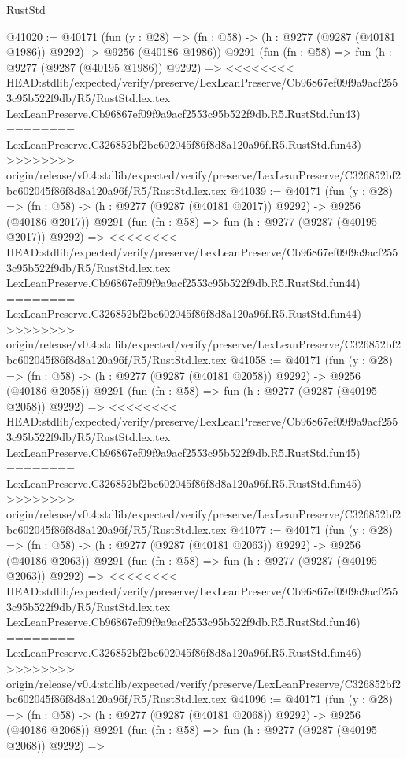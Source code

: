 \begin{lexlean}{RustStd}
\begin{coremodule}
{\begin{coremodule}
{{{{{{{{{{{{{{{{{{{{{{{{{{{{{{{{{{{{{{{{{{{{{{{{{{{{{{{@41020 := @40171
    (fun (y : @28) =>
    (fn : @58) -> (h : @9277 (@9287 (@40181 @1986)) @9292) -> @9256 (@40186 @1986))
    @9291
    (fun (fn : @58) =>
    fun (h : @9277 (@9287 (@40195 @1986)) @9292) =>
<<<<<<<< HEAD:stdlib/expected/verify/preserve/LexLeanPreserve/Cb96867ef09f9a9acf2553c95b522f9db/R5/RustStd.lex.tex
    LexLeanPreserve.Cb96867ef09f9a9acf2553c95b522f9db.R5.RustStd.fun43)
========
    LexLeanPreserve.C326852bf2bc602045f86f8d8a120a96f.R5.RustStd.fun43)
>>>>>>>> origin/release/v0.4:stdlib/expected/verify/preserve/LexLeanPreserve/C326852bf2bc602045f86f8d8a120a96f/R5/RustStd.lex.tex
@41039 := @40171
    (fun (y : @28) =>
    (fn : @58) -> (h : @9277 (@9287 (@40181 @2017)) @9292) -> @9256 (@40186 @2017))
    @9291
    (fun (fn : @58) =>
    fun (h : @9277 (@9287 (@40195 @2017)) @9292) =>
<<<<<<<< HEAD:stdlib/expected/verify/preserve/LexLeanPreserve/Cb96867ef09f9a9acf2553c95b522f9db/R5/RustStd.lex.tex
    LexLeanPreserve.Cb96867ef09f9a9acf2553c95b522f9db.R5.RustStd.fun44)
========
    LexLeanPreserve.C326852bf2bc602045f86f8d8a120a96f.R5.RustStd.fun44)
>>>>>>>> origin/release/v0.4:stdlib/expected/verify/preserve/LexLeanPreserve/C326852bf2bc602045f86f8d8a120a96f/R5/RustStd.lex.tex
@41058 := @40171
    (fun (y : @28) =>
    (fn : @58) -> (h : @9277 (@9287 (@40181 @2058)) @9292) -> @9256 (@40186 @2058))
    @9291
    (fun (fn : @58) =>
    fun (h : @9277 (@9287 (@40195 @2058)) @9292) =>
<<<<<<<< HEAD:stdlib/expected/verify/preserve/LexLeanPreserve/Cb96867ef09f9a9acf2553c95b522f9db/R5/RustStd.lex.tex
    LexLeanPreserve.Cb96867ef09f9a9acf2553c95b522f9db.R5.RustStd.fun45)
========
    LexLeanPreserve.C326852bf2bc602045f86f8d8a120a96f.R5.RustStd.fun45)
>>>>>>>> origin/release/v0.4:stdlib/expected/verify/preserve/LexLeanPreserve/C326852bf2bc602045f86f8d8a120a96f/R5/RustStd.lex.tex
@41077 := @40171
    (fun (y : @28) =>
    (fn : @58) -> (h : @9277 (@9287 (@40181 @2063)) @9292) -> @9256 (@40186 @2063))
    @9291
    (fun (fn : @58) =>
    fun (h : @9277 (@9287 (@40195 @2063)) @9292) =>
<<<<<<<< HEAD:stdlib/expected/verify/preserve/LexLeanPreserve/Cb96867ef09f9a9acf2553c95b522f9db/R5/RustStd.lex.tex
    LexLeanPreserve.Cb96867ef09f9a9acf2553c95b522f9db.R5.RustStd.fun46)
========
    LexLeanPreserve.C326852bf2bc602045f86f8d8a120a96f.R5.RustStd.fun46)
>>>>>>>> origin/release/v0.4:stdlib/expected/verify/preserve/LexLeanPreserve/C326852bf2bc602045f86f8d8a120a96f/R5/RustStd.lex.tex
@41096 := @40171
    (fun (y : @28) =>
    (fn : @58) -> (h : @9277 (@9287 (@40181 @2068)) @9292) -> @9256 (@40186 @2068))
    @9291
    (fun (fn : @58) =>
    fun (h : @9277 (@9287 (@40195 @2068)) @9292) =>
}}}}}}}}}}}}}}}}}}}}}}}}}}}}}}}}}}}}}}}}}}}}}}}}}}}}}}}
\end{coremodule}}
\end{coremodule}
\end{lexlean}
